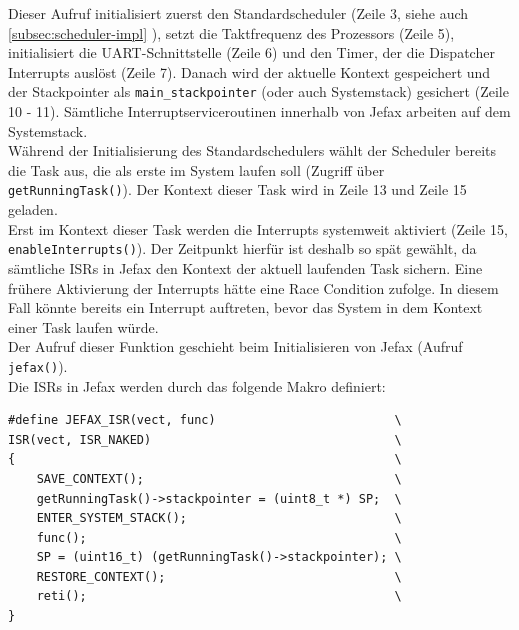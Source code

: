 \documentclass[fontsize=12pt, toc=bibliography, notitlepage]{scrreprt}
\newcommand{\refnn}[1]{\ref{#1} \nameref{#1}}
\begin{document}
Dieser Aufruf initialisiert zuerst den Standardscheduler (Zeile 3, siehe auch \refnn{subsec:scheduler-impl}), setzt die Taktfrequenz des Prozessors (Zeile 5), initialisiert die UART-Schnittstelle (Zeile 6) und den Timer, der die Dispatcher Interrupts auslöst (Zeile 7). Danach wird der aktuelle Kontext gespeichert und der Stackpointer als \lstinline$main_stackpointer$ (oder auch Systemstack) gesichert (Zeile 10 - 11). Sämtliche Interruptserviceroutinen innerhalb von Jefax arbeiten auf dem Systemstack.\\
Während der Initialisierung des Standardschedulers wählt der Scheduler bereits die Task aus, die als erste im System laufen soll (Zugriff über \lstinline$getRunningTask()$). Der Kontext dieser Task wird in Zeile 13 und Zeile 15 geladen.\\
Erst im Kontext dieser Task werden die Interrupts systemweit aktiviert (Zeile 15, \lstinline$enableInterrupts()$). Der Zeitpunkt hierfür ist deshalb so spät gewählt, da sämtliche ISRs in Jefax den Kontext der aktuell laufenden Task sichern. Eine frühere Aktivierung der Interrupts hätte eine Race Condition zufolge. In diesem Fall könnte bereits ein Interrupt auftreten, bevor das System in dem Kontext einer Task laufen würde.\\
Der Aufruf dieser Funktion geschieht beim Initialisieren von Jefax (Aufruf \lstinline$jefax()$).\\
Die ISRs in Jefax werden durch das folgende Makro definiert:

\begin{lstlisting}[title=interrupt.h]
#define JEFAX_ISR(vect, func)                         \
ISR(vect, ISR_NAKED)                                  \
{                                                     \
	SAVE_CONTEXT();                                   \
	getRunningTask()->stackpointer = (uint8_t *) SP;  \
	ENTER_SYSTEM_STACK();                             \
	func();                                           \
	SP = (uint16_t) (getRunningTask()->stackpointer); \
	RESTORE_CONTEXT();                                \
	reti();                                           \
}
\end{lstlisting}
\end{document}
